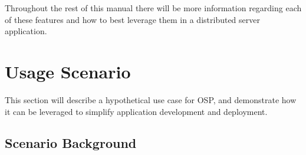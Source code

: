 \documentclass{book}
\begin{document}
Throughout the rest of this manual there will be more information regarding
each of these features and how to best leverage them in a distributed server
application.

\section{Usage Scenario}
This section will describe a hypothetical use case for OSP, and demonstrate how
it can be leveraged to simplify application development and deployment.

\subsection{Scenario Background}
\end{document}
